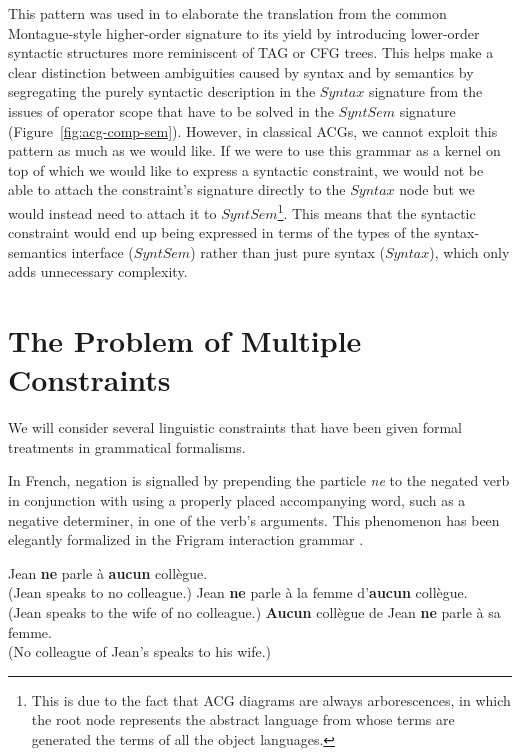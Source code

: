 \documentclass{llncs}
\begin{document}
This pattern was used in \cite{pogodalla2007generalizing} to elaborate the
translation from the common Montague-style \cite{montague1973proper}
higher-order signature to its yield by introducing lower-order syntactic
structures more reminiscent of TAG or CFG trees. This helps make a clear
distinction between ambiguities caused by syntax and by semantics by
segregating the purely syntactic description in the $Syntax$ signature from
the issues of operator scope that have to be solved in the $SyntSem$ signature
(Figure~\ref{fig:acg-comp-sem}). However, in classical ACGs, we cannot exploit
this pattern as much as we would like. If we were to use this grammar as a
kernel on top of which we would like to express a syntactic constraint, we
would not be able to attach the constraint's signature directly to the
$Syntax$ node but we would instead need to attach it to
$SyntSem$\footnote{This is due to the fact that ACG diagrams are always
  arborescences, in which the root node represents the abstract language from
  whose terms are generated the terms of all the object languages.}. This
means that the syntactic constraint would end up being expressed in terms of
the types of the syntax-semantics interface ($SyntSem$) rather than just pure
syntax ($Syntax$), which only adds unnecessary complexity.


\section{The Problem of Multiple Constraints}
\label{sec:constraints}

We will consider several linguistic constraints that have been given
formal treatments in grammatical formalisms.

In French, negation is signalled by prepending the particle \emph{ne} to the
negated verb in conjunction with using a properly placed accompanying word,
such as a negative determiner, in one of the verb's arguments. This phenomenon
has been elegantly formalized in the Frigram interaction grammar
\cite{perrier2007french}.

\begin{exe}
  \ex \label{ex:aucun-shallow} Jean \textbf{ne} parle à \textbf{aucun} collègue. \\
      (Jean speaks to no colleague.)
  \ex \label{ex:aucun-deep-obj} Jean \textbf{ne} parle à la femme d'\textbf{aucun} collègue. \\
      (Jean speaks to the wife of no colleague.)
  \ex \label{ex:aucun-deep-subj} \textbf{Aucun} collègue de Jean \textbf{ne} parle à sa femme. \\
      (No colleague of Jean's speaks to his wife.)
\end{exe}
\end{document}
